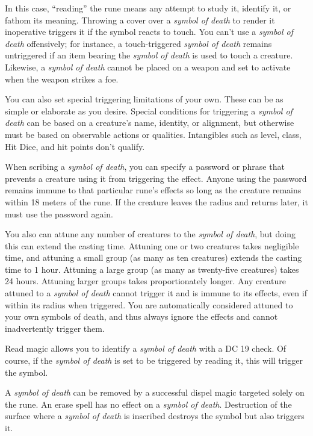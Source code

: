 {	In this case, ``reading'' the rune means any attempt to study it, identify it, or fathom its meaning. Throwing a cover over a \emph{symbol of death} to render it inoperative triggers it if the symbol reacts to touch. You can't use a \emph{symbol of death} offensively; for instance, a touch-triggered \emph{symbol of death} remains untriggered if an item bearing the \emph{symbol of death} is used to touch a creature. Likewise, a \emph{symbol of death} cannot be placed on a weapon and set to activate when the weapon strikes a foe.

	You can also set special triggering limitations of your own. These can be as simple or elaborate as you desire. Special conditions for triggering a \emph{symbol of death} can be based on a creature's name, identity, or alignment, but otherwise must be based on observable actions or qualities. Intangibles such as level, class, Hit Dice, and hit points don't qualify.

	When scribing a \emph{symbol of death}, you can specify a password or phrase that prevents a creature using it from triggering the effect. Anyone using the password remains immune to that particular rune's effects so long as the creature remains within 18 meters of the rune. If the creature leaves the radius and returns later, it must use the password again.

	You also can attune any number of creatures to the \emph{symbol of death}, but doing this can extend the casting time. Attuning one or two creatures takes negligible time, and attuning a small group (as many as ten creatures) extends the casting time to 1 hour. Attuning a large group (as many as twenty-five creatures) takes 24 hours. Attuning larger groups takes proportionately longer. Any creature attuned to a \emph{symbol of death} cannot trigger it and is immune to its effects, even if within its radius when triggered. You are automatically considered attuned to your own symbols of death, and thus always ignore the effects and cannot inadvertently trigger them.

	Read magic allows you to identify a \emph{symbol of death} with a DC 19  check. Of course, if the \emph{symbol of death} is set to be triggered by reading it, this will trigger the symbol.

	A \emph{symbol of death} can be removed by a successful dispel magic targeted solely on the rune. An erase spell has no effect on a \emph{symbol of death}. Destruction of the surface where a \emph{symbol of death} is inscribed destroys the symbol but also triggers it.

}

